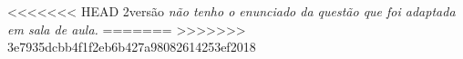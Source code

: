 \documentclass{book}
\begin{document}




<<<<<<< HEAD
2\textordfeminine vers\~ao \textit{n\~ao tenho o enunciado da quest\~ao que foi adaptada em sala de aula.}
=======
>>>>>>> 3e7935dcbb4f1f2eb6b427a98082614253ef2018








\end{document}
